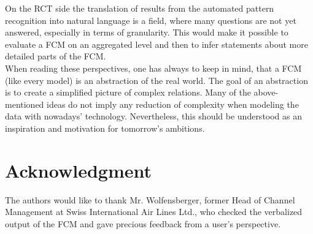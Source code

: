 \documentclass[conference]{IEEEtran}
\begin{document}
On the RCT side the translation of results from the automated pattern recognition into natural language is a field, where many questions are not yet answered, especially in terms of granularity. This would make it possible to evaluate a FCM on an aggregated level and then to infer statements about more detailed parts of the FCM.\\
When reading these perspectives, one has always to keep in mind, that a FCM (like every model) is an abstraction of the real world. The goal of an abstraction is to create a simplified picture of complex relations. Many of the above-mentioned ideas do not imply any reduction of complexity when modeling the data with nowadays' technology. Nevertheless, this should be understood as an inspiration and motivation for tomorrow's ambitions.

\section*{Acknowledgment}
The authors would like to thank Mr. Wolfensberger, former Head of Channel Management at Swiss International Air Lines Ltd., who checked the verbalized output of the FCM and gave precious feedback from a user's perspective.



\end{document}
